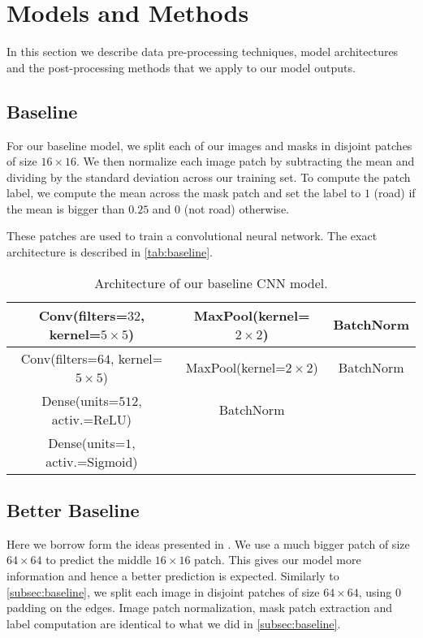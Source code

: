 \section{Models and Methods} \label{sec:models-and-methods}
In this section we describe data pre-processing techniques, model architectures and the post-processing methods that we apply to our model outputs.

\subsection{Baseline} \label{subsec:baseline}
For our baseline model, we split each of our images and masks in disjoint patches of size $16 \times 16$. We then normalize each image patch by subtracting the mean and dividing by the standard deviation across our training set. To compute the patch label, we compute the mean across the mask patch and set the label to $1$ (road) if the mean is bigger than $0.25$ and $0$ (not road) otherwise.

These patches are used to train a convolutional neural network. The exact architecture is described in \autoref{tab:baseline}.

\begin{table}[h]
    \centering
    \begin{tabular}{|c|c|c|}
        \hline
        Conv(filters=$32$, kernel=$5 \times 5$) & MaxPool(kernel=$2 \times 2$) & BatchNorm \\
        \hline
        \hline
        Conv(filters=$64$, kernel=$5 \times 5$) & MaxPool(kernel=$2 \times 2$) & BatchNorm \\
        \hline
        \hline
        Dense(units=$512$, activ.=ReLU) & BatchNorm &  \\
        \hline
        \hline
        Dense(units=$1$, activ.=Sigmoid) & & \\
        \hline
    \end{tabular}
    \caption{Architecture of our baseline CNN model.}
    \label{tab:baseline}
\end{table}

\subsection{Better Baseline} \label{subsec:better-baseline}
Here we borrow form the ideas presented in \cite{Mni10}. We use a much bigger patch of size $64 \times 64$ to predict the middle $16 \times 16$ patch. This gives our model more information and hence a better prediction is expected. Similarly to \autoref{subsec:baseline}, we split each image in disjoint patches of size $64 \times 64$, using $0$ padding on the edges. Image patch normalization, mask patch extraction and label computation are identical to what we did in \autoref{subsec:baseline}.

